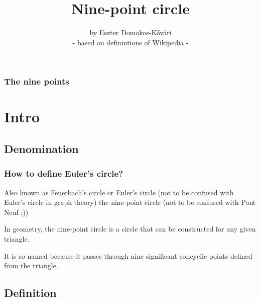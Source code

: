 \documentclass{beamer}
\begin{document}
\author{by Eszter Domokos-Kővári  \\  \tiny   - based on definintions of Wikipedia -}
	
\title{Nine-point circle} 

\setlength{\parindent}{1em}



    \begin{frame}
    \maketitle
    \end{frame}



    \begin{frame}

\frametitle{The nine points}



    \vspace{2 cm}

    \end{frame}

\section{Intro}

\subsection{Denomination}
    \begin{frame}
    \frametitle{How to define Euler's circle?}
 

     Also known as Feuerbach's circle or Euler's circle
(not to be confused with Euler’s circle in graph theory)
the nine-point circle  (not to be confused with Pont Neuf ;))   \par  

    In geometry, the nine-point circle is a circle
that can be constructed for any given triangle. \par

    It is so named because it passes through
nine significant concyclic points defined from the triangle.


    \end{frame}

\subsection{Definition}
\end{document}
